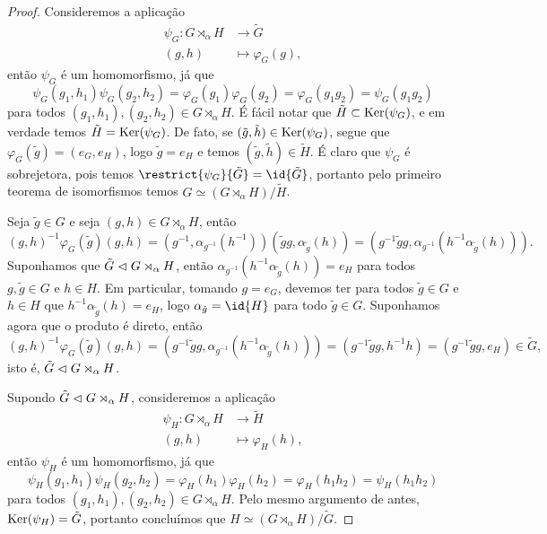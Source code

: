 \begin{proof}
    Consideremos a aplicação
    \begin{align*}
        \psi_{G} : G\rtimes_{\alpha}H &\to \tilde{G}\\
                                (g,h) &\mapsto \varphi_G(g),
    \end{align*}
    então \(\psi_G\) é um homomorfismo, já que
    \begin{equation*}
        \psi_G(g_1, h_1) \psi_G(g_2, h_2) = \varphi_G(g_1)\varphi_G(g_2) = \varphi_G(g_1 g_2) = \psi_G(g_1g_2)
    \end{equation*}
    para todos \((g_1, h_1), (g_2, h_2) \in G \rtimes_{\alpha} H\). É fácil notar que \(\tilde{H} \subset \operatorname{Ker}(\psi_G)\), e em verdade temos \(\tilde{H} = \operatorname{Ker}(\psi_G)\). De fato, se \((\tilde{g}, \tilde{h}) \in \operatorname{Ker}(\psi_G)\), segue que \(\varphi_G(\tilde{g}) = (e_G, e_H)\), logo \(\tilde{g} = e_H\) e temos \((\tilde{g}, \tilde{h}) \in \tilde{H}\). É claro que \(\psi_G\) é sobrejetora, pois temos \(\restrict{\psi_G}{\tilde{G}} = \id{\tilde{G}}\), portanto pelo primeiro teorema de isomorfismos temos \(G \simeq (G\rtimes_{\alpha} H)/\tilde{H}\).

    Seja \(\tilde{g} \in G\) e seja \((g, h) \in G \rtimes_{\alpha} H\), então
    \begin{equation*}
        (g, h)^{-1} \varphi_G(\tilde{g}) (g, h) = \left(g^{-1}, \alpha_{g^{-1}}(h^{-1})\right) (\tilde{g}g, \alpha_{\tilde{g}}(h)) = \left(g^{-1}\tilde{g}g, \alpha_{g^{-1}}(h^{-1} \alpha_{\tilde{g}}(h))\right).
    \end{equation*}
    Suponhamos que \(\tilde{G} \vartriangleleft G \rtimes_{\alpha} H\), então \(\alpha_{g^{-1}}(h^{-1} \alpha_{\tilde{g}}(h)) = e_H\) para todos \(g, \tilde{g} \in G\) e \(h \in H\). Em particular, tomando \(g = e_G\), devemos ter para todos \(\tilde{g} \in G\) e \(h \in H\) que \(h^{-1} \alpha_{\tilde{g}}(h) = e_H\), logo \(\alpha_{\tilde{g}} = \id{H}\) para todo \(\tilde{g} \in G\). Suponhamos agora que o produto é direto, então
    \begin{equation*}
        (g, h)^{-1} \varphi_G(\tilde{g}) (g, h) = \left(g^{-1}\tilde{g}g, \alpha_{g^{-1}}(h^{-1} \alpha_{\tilde{g}}(h))\right) = \left(g^{-1}\tilde{g}g, h^{-1} h\right) = (g^{-1}\tilde{g}g, e_H) \in \tilde{G},
    \end{equation*}
    isto é, \(\tilde{G} \vartriangleleft G\rtimes_{\alpha} H\).

    Supondo \(\tilde{G} \vartriangleleft G\rtimes_{\alpha} H\), consideremos a aplicação
    \begin{align*}
        \psi_{H} : G\rtimes_{\alpha}H &\to \tilde{H}\\
                                (g,h) &\mapsto \varphi_H(h),
    \end{align*}
    então \(\psi_H\) é um homomorfismo, já que
    \begin{equation*}
        \psi_H(g_1, h_1) \psi_H(g_2, h_2) = \varphi_H(h_1)\varphi_H(h_2) = \varphi_H(h_1 h_2) = \psi_H(h_1h_2)
    \end{equation*}
    para todos \((g_1, h_1), (g_2, h_2) \in G \rtimes_{\alpha} H\). Pelo mesmo argumento de antes, \(\operatorname{Ker}(\psi_H) = \tilde{G}\), portanto concluímos que \(H \simeq (G \rtimes_{\alpha} H)/\tilde{G}\).
\end{proof}
